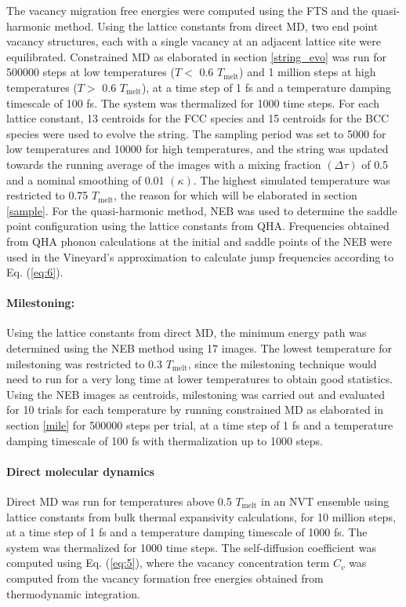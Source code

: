 \documentclass{article}
\begin{document}
The vacancy migration free energies were computed using the FTS and the quasi-harmonic method. Using the lattice constants from direct MD, two end point vacancy structures, each with a single vacancy at an adjacent lattice site were equilibrated. Constrained MD as elaborated in section \ref{string_evo} was run for 500000 steps at low temperatures ($T<$ 0.6 $T_{\mathrm{melt}}$) and 1 million steps at high temperatures ($T>$ 0.6 $T_{\mathrm{melt}}$), at a time step of 1 fs and a temperature damping timescale of 100 fs. The system was thermalized for 1000 time steps. For each lattice constant, 13 centroids for the FCC species and 15 centroids for the BCC species were used to evolve the string. The sampling period was set to 5000 for low temperatures and 10000 for high temperatures, and the string was updated towards the running average of the images with a mixing fraction $(\Delta \tau)$ of 0.5 and a nominal smoothing of 0.01 $(\kappa)$. The highest simulated temperature was restricted to 0.75 $T_{\mathrm{melt}}$, the reason for which will be elaborated in section \ref{sample}. For the quasi-harmonic method, NEB was used to determine the saddle point configuration using the lattice constants from QHA. Frequencies obtained from QHA phonon calculations at the initial and saddle points of the NEB were used in the Vineyard's approximation to calculate jump frequencies according to Eq. (\ref{eq:6}).

\paragraph*{Milestoning:}

Using the lattice constants from direct MD, the minimum energy path was determined using the NEB method using 17 images. The lowest temperature for milestoning was restricted to 0.3 $T_{\mathrm{melt}}$, since the milestoning technique would need to run for a very long time at lower temperatures to obtain good statistics. Using the NEB images as centroids, milestoning was carried out and evaluated for 10 trials for each temperature by running constrained MD as elaborated in section \ref{mile} for 500000 steps per trial, at a time step of 1 fs and a temperature damping timescale of 100 fs with thermalization up to 1000 steps.

\paragraph*{Direct molecular dynamics}

Direct MD was run for temperatures above 0.5 $T_{\mathrm{melt}}$ in an NVT ensemble using lattice constants from bulk thermal expansivity calculations, for 10 million steps, at a time step of 1 fs and a temperature damping timescale of 1000 fs. The system was thermalized for 1000 time steps. The self-diffusion coefficient was computed using Eq. (\ref{eq:5}), where the vacancy concentration term $C_v$ was computed from the vacancy formation free energies obtained from thermodynamic integration.
\end{document}
